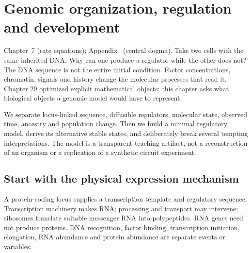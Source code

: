 \chapter{Genomic organization, regulation and development}
{Chapter~7 (rate equations); Appendix~ (central dogma).}
Take two cells with the same inherited DNA. Why can one produce a regulator while
the other does not? The DNA sequence is not the entire initial condition.
Factor concentrations, chromatin, signals and history change the molecular
processes that read it. Chapter 29 optimized explicit mathematical objects;
this chapter asks what biological objects a genomic model would have to represent.

We separate locus-linked sequence, diffusible regulators, molecular state,
observed time, ancestry and population change. Then we build a minimal regulatory
model, derive its alternative stable states, and deliberately break several
tempting interpretations. The model is a transparent teaching artifact, not a
reconstruction of an organism or a replication of a synthetic circuit experiment.

\section{Start with the physical expression mechanism}
A protein-coding locus supplies a transcription template and regulatory sequence.
Transcription machinery makes RNA; processing and transport may intervene;
ribosomes translate suitable messenger RNA into polypeptides. RNA genes need not
produce proteins. DNA recognition, factor binding, transcription initiation,
elongation, RNA abundance and protein abundance are separate events or variables.

